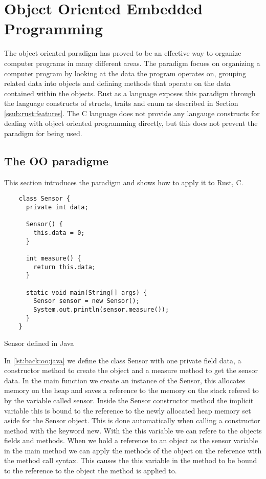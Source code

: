 \section{Object Oriented Embedded Programming}
\label{sec:back:oo}

The object oriented paradigm has proved to be an effective way to organize computer programs in many different areas.
The paradigm focues on organizing a computer program by looking at the data the program operates on, grouping related data into objects and defining methods that operate on the data contained within the objects.
Rust as a language exposes this paradigm through the language constructs of structs, traits and enum as described in Section \ref{ssub:rust:features}.
The C language does not provide any langauge constructs for dealing with object oriented programming directly, but this does not prevent the paradigm for being used.

\subsection{The OO paradigme}
This section introduces the paradigm and shows how to apply it to Rust, C.

\begin{listing}[H]
  \begin{verbatim}
    class Sensor {
      private int data;

      Sensor() {
        this.data = 0;
      }

      int measure() {
        return this.data;
      }

      static void main(String[] args) {
        Sensor sensor = new Sensor();
        System.out.println(sensor.measure());
      }
    }
  \end{verbatim}
  \caption{Sensor defined in Java}
  \label{lst:back:oo:java}
\end{listing}

In \autoref{lst:back:oo:java} we define the class Sensor with one private field data, a constructor method to create the object and a measure method to get the sensor data.
In the main function we create an instance of the Sensor, this allocates memory on the heap and saves a reference to the memory on the stack refered to by the  variable called sensor.
Inside the Sensor constructor method the implicit variable this is bound to the reference to the newly allocated heap memory set aside for the Sensor object.
This is done automatically when calling a constructor method with the keyword new.
With the this variable we can refere to the objects fields and methods.
When we hold a reference to an object as the sensor variable in the main method we can apply the methods of the object on the reference with the method call syntax.
This causes the this variable in the method to be bound to the reference to the object the method is applied to.

